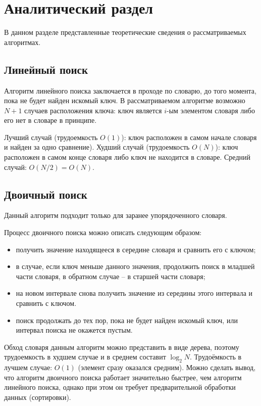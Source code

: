 \chapter{Аналитический раздел}

В данном разделе представленные теоретические сведения о рассматриваемых алгоритмах.

\section{Линейный поиск}

Алгоритм линейного поиска заключается в проходе по словарю, до того момента, пока не будет найден искомый ключ. В рассматриваемом алгоритме возможно $N + 1$ случаев расположения ключа: ключ является $i$-ым элементом словаря либо его нет в словаре в принципе. 

Лучший случай (трудоемкость $O(1)$): ключ расположен в самом начале словаря и найден за одно сравнение). Худший случай (трудоемкость $O(N)$): ключ расположен в самом конце словаря либо ключ не находится в словаре. Средний случай: $O(N/2) = O(N)$.

\section{Двоичный поиск}

Данный алгоритм подходит только для заранее упорядоченного словаря.

Процесс двоичного поиска можно описать следующим образом: 

\begin{itemize}
	\item получить значение находящееся в середине словаря и сравнить его с ключом;
	\item в случае, если ключ меньше данного значения, продолжить поиск в младшей части словаря, в обратном случае -- в старшей части словаря;
	\item на новом интервале снова получить значение из середины этого интервала и сравнить с ключом.
	\item поиск продолжать до тех пор, пока не будет найден искомый ключ, или интервал поиска не окажется пустым.
\end{itemize}

Обход словаря данным алгоритм можно представить в виде дерева, поэтому трудоемкость в худшем случае и в среднем составит $\log_{2}{N}$. Трудоёмкость в лучшем случае: $O(1)$ (элемент сразу оказался средним). Можно сделать вывод, что алгоритм двоичного поиска работает значительно быстрее, чем алгоритм линейного поиска, однако при этом он требует предварительной обработки данных (сортировки).


